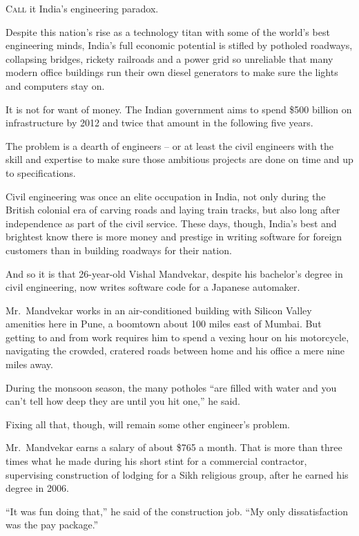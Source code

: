 ﻿\documentclass[12pt]{article}
\begin{document}
\lettrine{C}{all} it India's engineering paradox.

Despite this nation's rise as a technology titan with some of the world's best engineering minds,
India's full economic potential is stifled by potholed roadways, collapsing bridges, rickety
railroads and a power grid so unreliable that many modern office buildings run their own diesel
generators to make sure the lights and computers stay on.

It is not for want of money. The Indian government aims to spend \$500 billion on infrastructure by
2012 and twice that amount in the following five years.

The problem is a dearth of engineers -- or at least the civil engineers with the skill and expertise
to make sure those ambitious projects are done on time and up to specifications.

Civil engineering was once an elite occupation in India, not only during the British colonial era of
carving roads and laying train tracks, but also long after independence as part of the civil
service. These days, though, India's best and brightest know there is more money and prestige in
writing software for foreign customers than in building roadways for their nation.

And so it is that 26-year-old Vishal Mandvekar, despite his bachelor's degree in civil engineering,
now writes software code for a Japanese automaker.

Mr.~Mandvekar works in an air-conditioned building with Silicon Valley amenities here in Pune, a
boomtown about 100 miles east of Mumbai. But getting to and from work requires him to spend a vexing
hour on his motorcycle, navigating the crowded, cratered roads between home and his office a mere
nine miles away.

During the monsoon season, the many potholes ``are filled with water and you can't tell how deep
they are until you hit one,'' he said.

Fixing all that, though, will remain some other engineer's problem.

Mr.~Mandvekar earns a salary of about \$765 a month. That is more than three times what he made
during his short stint for a commercial contractor, supervising construction of lodging for a Sikh
religious group, after he earned his degree in 2006.

``It was fun doing that,'' he said of the construction job. ``My only dissatisfaction was the pay
package.''
\end{document}
